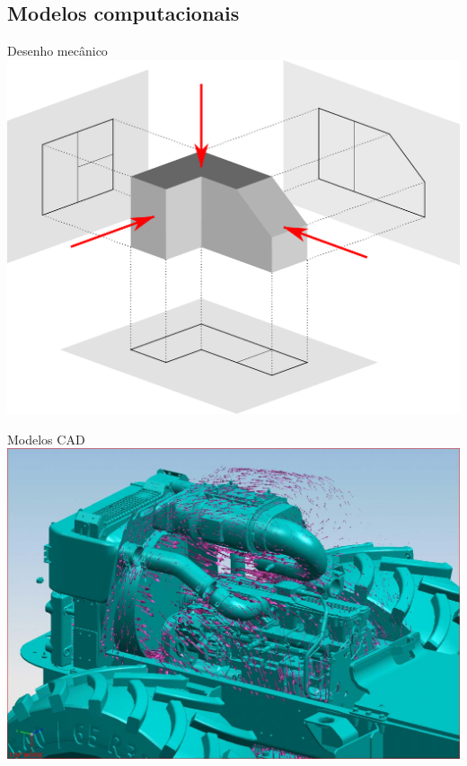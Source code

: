 \documentclass{beamer}
\begin{document}
\subsection{Modelos computacionais}

\begin{frame}{Desenho mecânico}
  \centering
  \includegraphics[width=\textwidth]{modelos/2000px-First_angle_projection}
\end{frame}

\begin{frame}{Modelos CAD}
  \centering
  \includegraphics[width=\textwidth]{modelos/Ugs-nx-5-engine-airflow-simulation}
\end{frame}
\end{document}
